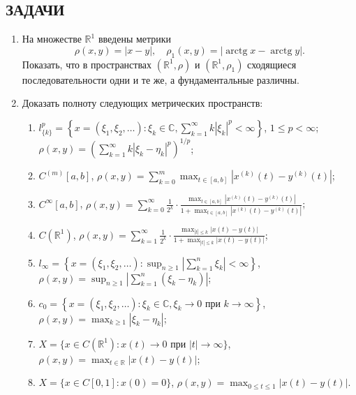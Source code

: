 \documentclass[12pt,a4paper]{article}
\begin{document}
\subsection*{ЗАДАЧИ}
\begin{enumerate}
\item На множестве $\mathbb{R}^{1}$ введены метрики
$$\rho(x, y) = |x - y|, \quad \rho_{1}(x, y) = |\operatorname{arctg} x - \operatorname{arctg} y|.$$
Показать, что в пространствах $(\mathbb{R}^{1}, \rho)$ и $(\mathbb{R}^{1}, \rho_{1})$ сходящиеся последовательности одни и те же, а фундаментальные различны.

\item Доказать полноту следующих метрических пространств:
\begin{enumerate}[label=\alph*)]
\item $l_{\{k\}}^{p} = \left\{x = (\xi_{1}, \xi_{2}, \dots) : \xi_{k} \in \mathbb{C}, \sum_{k=1}^{\infty} k|\xi_{k}|^{p} < \infty\right\}$, $1 \le p < \infty$; \\
$\rho(x, y) = \left( \sum_{k=1}^{\infty} k|\xi_{k} - \eta_{k}|^{p} \right)^{1/p}$;
\item $C^{(m)}[a, b]$, $\rho(x, y) = \sum_{k=0}^{m} \max_{t\in[a, b]} |x^{(k)}(t) - y^{(k)}(t)|$;
\item $C^{\infty}[a, b]$, $\rho(x, y) = \sum_{k=0}^{\infty} \frac{1}{2^{k}} \cdot \frac{\max_{t\in[a, b]} |x^{(k)}(t) - y^{(k)}(t)|}{1 + \max_{t\in[a, b]} |x^{(k)}(t) - y^{(k)}(t)|}$;
\item $C(\mathbb{R}^{1})$, $\rho(x, y) = \sum_{k=1}^{\infty} \frac{1}{2^{k}} \cdot \frac{\max_{|t|\le k} |x(t) - y(t)|}{1 + \max_{|t|\le k} |x(t) - y(t)|}$;
\item $l_{\infty} = \left\{x = (\xi_{1}, \xi_{2}, \dots) : \sup_{n\ge1} \left| \sum_{k=1}^{n} \xi_{k} \right| < \infty \right\}$, \\ $\rho(x, y) = \sup_{n\ge1} \left| \sum_{k=1}^{n} (\xi_{k} - \eta_{k}) \right|$;
\item $c_{0} = \left\{x = (\xi_{1}, \xi_{2}, \dots) : \xi_{k} \in \mathbb{C}, \xi_{k} \rightarrow 0 \text{ при } k \rightarrow \infty\right\}$, \\ $\rho(x, y) = \max_{k\ge1} |\xi_{k} - \eta_{k}|$;
\item $X = \{x \in C(\mathbb{R}^{1}) : x(t) \rightarrow 0 \text{ при } |t| \rightarrow \infty\}$, \\ $\rho(x, y) = \max_{t\in\mathbb{R}} |x(t) - y(t)|$;
\item $X = \{x \in C[0, 1] : x(0) = 0\}$, $\rho(x, y) = \max_{0\le t\le1} |x(t) - y(t)|$.
\end{enumerate}


\end{enumerate}
\end{document}
